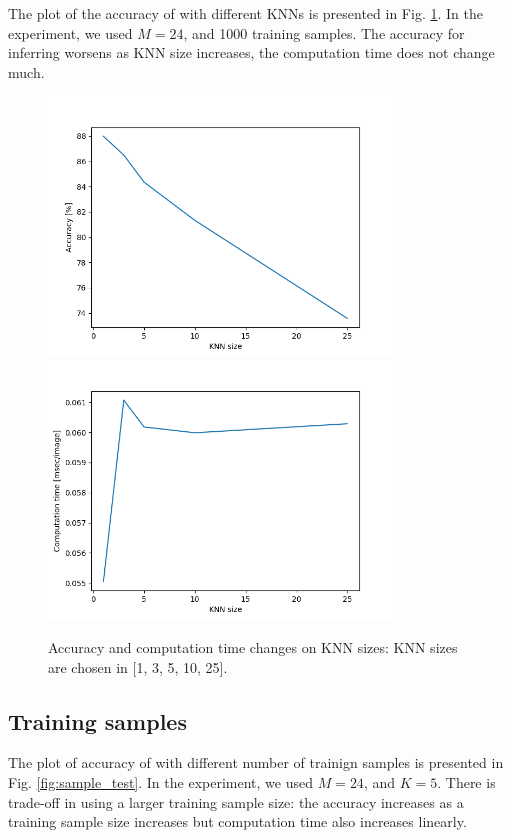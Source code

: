 \documentclass[conference]{IEEEtran}
\begin{document}
The plot of the accuracy of with different KNNs is presented in Fig. \ref{fig:knn_test}.
In the experiment, we used $M=24$, and 1000 training samples.
The accuracy for inferring worsens as KNN size increases, the computation time does not change much.

\begin{figure}[!t]
	\centering
	\includegraphics[width=3.6in]{knn_test.png}	
	\includegraphics[width=3.6in]{knn_time.png}	
	\caption{Accuracy and computation time changes on KNN sizes: KNN sizes are chosen in [1, 3, 5, 10, 25].}
	\label{fig:knn_test}
\end{figure}


\subsection{Training samples}

The plot of accuracy of with different number of trainign samples is presented in Fig. \ref{fig:sample_test}.
In the experiment, we used $M=24$, and $K=5$.
There is trade-off in using a larger training sample size: the accuracy increases as a training sample size increases but computation time also increases linearly.
\end{document}
